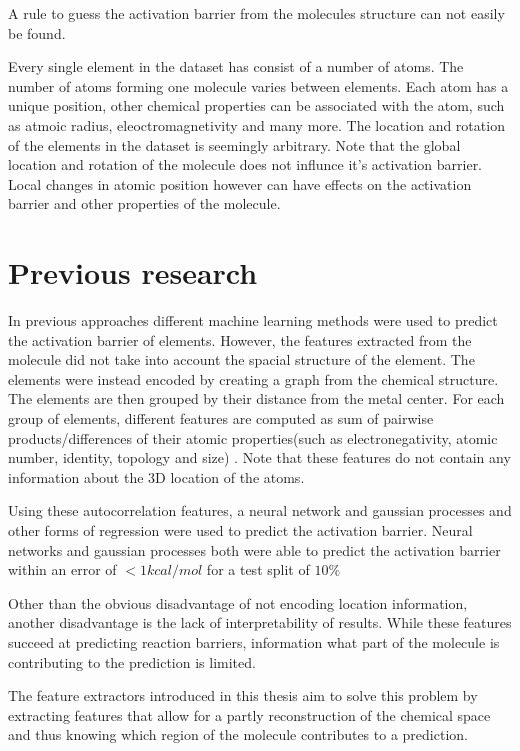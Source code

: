 A rule to guess the activation barrier from the molecules structure can not easily be found.

Every single element in the dataset has consist of a number of atoms.
The number of atoms forming one molecule varies between elements.
Each atom has a unique position, other chemical properties can be associated with the atom, such as atmoic radius, eleoctromagnetivity and many more.
The location and rotation of the elements in the dataset is seemingly arbitrary.
Note that the global location and rotation of the molecule does not influnce it's activation barrier.
Local changes in atomic position however can have effects on the activation barrier and other properties of the molecule.
  

\section{Previous research}

In previous approaches different machine learning methods were used to predict the activation barrier of elements.
However, the features extracted from the molecule did not take into account the spacial structure of the element.
The elements were instead encoded by creating a graph from the chemical structure.
The elements are then grouped by their distance from the metal center.
For each group of elements, different features are computed as sum of pairwise products/differences of their atomic properties(such as electronegativity, atomic number, identity, topology and size) \cite{friederich_dos}.
Note that these features do not contain any information about the 3D location of the atoms.

Using these autocorrelation features, a neural network and gaussian processes and other forms of regression were used to predict the activation barrier.
Neural networks and gaussian processes both were able to predict the activation barrier within an error of $<1 kcal/mol$ for a test split of $10\%$

Other than the obvious disadvantage of not encoding location information, another disadvantage is the lack of interpretability of results.
While these features succeed at predicting reaction barriers, information what part of the molecule is contributing to the prediction is limited.

The feature extractors introduced in this thesis aim to solve this problem by extracting features that allow for a
partly reconstruction of the chemical space and thus knowing which region of the molecule contributes to a prediction.

